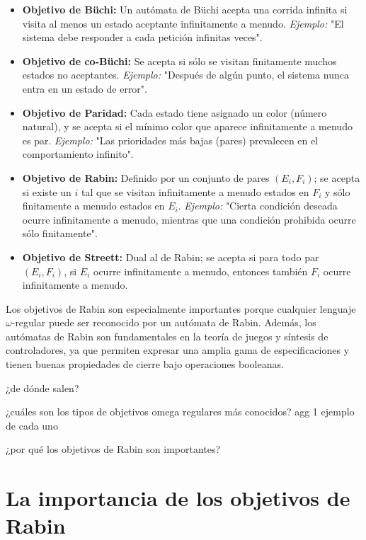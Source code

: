 \begin{itemize}
	\item \textbf{Objetivo de Büchi:} Un autómata de Büchi acepta una corrida infinita si visita al menos un estado aceptante infinitamente a menudo. \emph{Ejemplo:} "El sistema debe responder a cada petición infinitas veces".
	\item \textbf{Objetivo de co-Büchi:} Se acepta si sólo se visitan finitamente muchos estados no aceptantes. \emph{Ejemplo:} "Después de algún punto, el sistema nunca entra en un estado de error".
	\item \textbf{Objetivo de Paridad:} Cada estado tiene asignado un color (número natural), y se acepta si el mínimo color que aparece infinitamente a menudo es par. \emph{Ejemplo:} "Las prioridades más bajas (pares) prevalecen en el comportamiento infinito".
	\item \textbf{Objetivo de Rabin:} Definido por un conjunto de pares $(E_i, F_i)$; se acepta si existe un $i$ tal que se visitan infinitamente a menudo estados en $F_i$ y sólo finitamente a menudo estados en $E_i$. \emph{Ejemplo:} "Cierta condición deseada ocurre infinitamente a menudo, mientras que una condición prohibida ocurre sólo finitamente".
	\item \textbf{Objetivo de Streett:} Dual al de Rabin; se acepta si para todo par $(E_i, F_i)$, si $E_i$ ocurre infinitamente a menudo, entonces también $F_i$ ocurre infinitamente a menudo.
\end{itemize}

Los objetivos de Rabin son especialmente importantes porque cualquier lenguaje
$\omega$-regular puede ser reconocido por un autómata de Rabin. Además, los
autómatas de Rabin son fundamentales en la teoría de juegos y síntesis de
controladores, ya que permiten expresar una amplia gama de especificaciones y
tienen buenas propiedades de cierre bajo operaciones booleanas.

¿de dónde salen?

¿cuáles son los tipos de objetivos omega regulares más conocidos? agg 1 ejemplo de cada uno

¿por qué los objetivos de Rabin son importantes?

\section{La importancia de los objetivos de Rabin}

